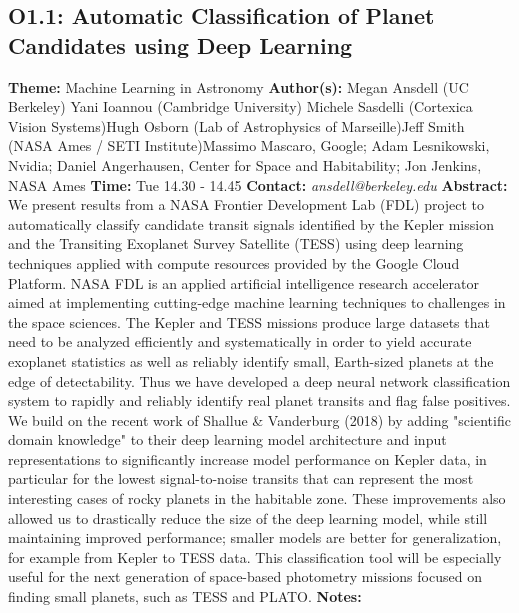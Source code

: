 \documentclass{report}
\begin{document}
{{{{{{{{\subsection*{O1.1: Automatic Classification of  Planet Candidates using Deep Learning}
{\bf Theme:}  Machine Learning in Astronomy\newline
{\bf Author(s):}\newline
Megan Ansdell (UC Berkeley) \newline Yani Ioannou (Cambridge University) \newline  Michele Sasdelli (Cortexica Vision Systems)\newline  Hugh Osborn (Lab of Astrophysics of Marseille)\newline Jeff Smith (NASA Ames / SETI Institute)\newline  Massimo Mascaro, Google; Adam Lesnikowski, Nvidia; Daniel Angerhausen, Center for Space and Habitability; Jon Jenkins, NASA Ames\newline\newline
{\bf Time:} Tue 14.30 - 14.45\newline
\newline
{\bf Contact:} {\it ansdell@berkeley.edu}\newline
\newline\newline
{\bf Abstract:}\newline
We present results from a NASA Frontier Development Lab (FDL) project to automatically classify candidate transit signals identified by the Kepler mission and the Transiting Exoplanet Survey Satellite (TESS) using deep learning techniques applied with compute resources provided by the Google Cloud Platform. NASA FDL is an applied artificial intelligence research accelerator aimed at implementing cutting-edge machine learning techniques to challenges in the space sciences. The Kepler and TESS missions produce large datasets that need to be analyzed efficiently and systematically in order to yield accurate exoplanet statistics as well as reliably identify small, Earth-sized planets at the edge of detectability. Thus we have developed a deep neural network classification system to rapidly and reliably identify real planet transits and flag false positives. We build on the recent work of Shallue \& Vanderburg (2018) by adding "scientific domain knowledge" to their deep learning model architecture and input representations to significantly increase model performance on Kepler data, in particular for the lowest signal-to-noise transits that can represent the most interesting cases of rocky planets in the habitable zone. These improvements also allowed us to drastically reduce the size of the deep learning model, while still maintaining improved performance; smaller models are better for generalization, for example from Kepler to TESS data. This classification tool will be especially useful for the next generation of space-based photometry missions focused on finding small planets, such as TESS and PLATO.\newline
{\bf Notes:}\newline
{\newpage
}}}}}}}}}
\end{document}
